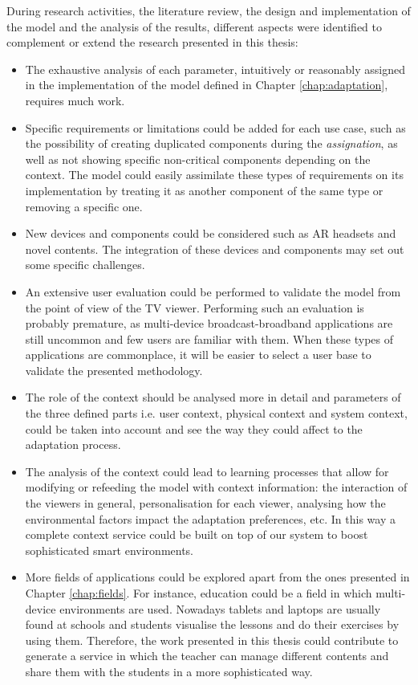 During research activities, the literature review, the design and implementation of the model and the analysis of the results, different aspects were identified to complement or extend the research presented in this thesis: 
\begin{itemize}
	\item The exhaustive analysis of each parameter, intuitively or reasonably assigned in the implementation of the model defined in Chapter \ref{chap:adaptation}, requires much work.
	\item Specific requirements or limitations could be added for each use case, such as the possibility of creating duplicated components during the \textit{assignation}, as well as not showing specific non-critical components depending on the context. The model could easily assimilate these types of requirements on its implementation by treating it as another component of the same type or removing a specific one. 
	\item New devices and components could be considered such as AR headsets and novel contents. The integration of these devices and components may set out some specific challenges. 
	\item An extensive user evaluation could be performed to validate the model from the point of view of the TV viewer. Performing such an evaluation is probably premature, as multi-device broadcast-broadband applications are still uncommon and few users are familiar with them. When these types of applications are commonplace, it will be easier to select a user base to validate the presented methodology.
	\item The role of the context should be analysed more in detail and parameters of the three defined parts i.e. user context, physical context and system context, could be taken into account and see the way they could affect to the adaptation process.
	\item The analysis of the context could lead to learning processes that allow for modifying or refeeding the model with context information: the interaction of the viewers in general, personalisation for each viewer, analysing how the environmental factors impact the adaptation preferences, etc. In this way a complete context service could be built on top of our system to boost sophisticated smart environments. 
	\item More fields of applications could be explored apart from the ones presented in Chapter \ref{chap:fields}. For instance, education could be a field in which multi-device environments are used. Nowadays tablets and laptops are usually found at schools and students visualise the lessons and do their exercises by using them. Therefore, the work presented in this thesis could contribute to generate a service in which the teacher can manage different contents and share them with the students in a more sophisticated way. 	
\end{itemize}
 

  

	



